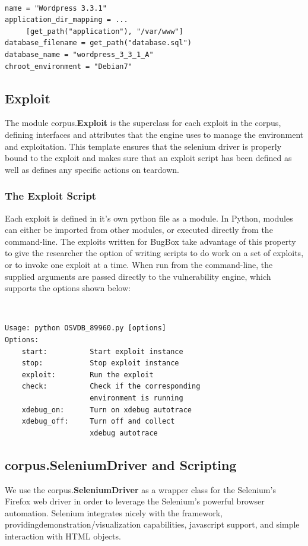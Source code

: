 \documentclass[letterpaper,twocolumn,10pt]{article}
\begin{document}
{\tt \small
\begin{verbatim}
name = "Wordpress 3.3.1"
application_dir_mapping = ...
     [get_path("application"), "/var/www"]
database_filename = get_path("database.sql")
database_name = "wordpress_3_3_1_A"
chroot_environment = "Debian7"
\end{verbatim}
} 

\subsection{Exploit}
The module corpus.{\bf Exploit} is the superclass for each exploit in the corpus, defining interfaces and attributes that the engine uses to manage the environment and exploitation.  This template ensures that the selenium driver is properly bound to the exploit and makes sure that an exploit script has been defined as well as defines any specific actions on teardown.

\subsubsection{The Exploit Script}

Each exploit is defined in it's own python file as a module. In Python, modules can either be imported from other modules, or executed directly from the command-line. The exploits written for BugBox take advantage of this property to give the researcher the option of writing scripts to do work on a set of exploits, or to invoke one exploit at a time. When run from the command-line, the supplied arguments are passed directly to the vulnerability engine, which supports the options shown below: 

{\tt \small
\begin{verbatim}
Usage: python OSVDB_89960.py [options]
Options:
    start:          Start exploit instance
    stop:           Stop exploit instance
    exploit:        Run the exploit
    check:          Check if the corresponding 
                    environment is running
    xdebug_on:      Turn on xdebug autotrace
    xdebug_off:     Turn off and collect 
                    xdebug autotrace
\end{verbatim}
}

\subsection{corpus.{\bf SeleniumDriver} and Scripting}
We use the corpus.{\bf SeleniumDriver} as a wrapper class for the Selenium's Firefox web driver in order to leverage the Selenium's powerful browser automation.  Selenium integrates nicely with the framework, providingdemonstration/visualization capabilities, javascript support, and simple interaction with HTML objects.
\end{document}
